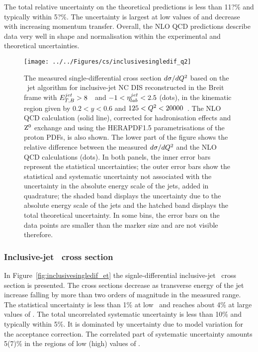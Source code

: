 The total relative uncertainty on the theoretical predictions is less than 11?\% and typically within 5?\%. The uncertainty is largest at low values of \qsq and decrease with increasing momentum transfer. Overall, the NLO QCD predictions describe data very well in shape and normalisation within the experimental and theoretical uncertainties.
\begin{figure}[p]
	\centering
		\texttt{[image: ../../Figures/cs/inclusivesingledif\_q2]}
	\caption{The measured single-differential cross section $d\sigma/d\mbox{${Q^2}$}$ based on the \kt~jet algorithm for inclusive-jet NC DIS reconstructed in the Breit frame with $\mbox{$E_{T,B}^{jet}$} > 8$~\GeV~and $-1<\mbox{$\eta^{jet}_{lab}$}<2.5$ (dots), in the kinematic region given by $0.2<y<0.6$ and $125 < \mbox{${Q^2}$} < 20000$~\GeV. The NLO QCD calculation (solid line), corrected for hadronisation effects and $\mbox{$\rm{Z}^0$}$ exchange and using the HERAPDF1.5 parametrisations of the proton PDFs, is also shown. The lower part of the figure shows the relative difference between the measured $d\sigma/d\mbox{${Q^2}$}$ and the NLO QCD calculations (dots). In both panels, the inner error bars represent the statistical uncertainties; the outer error bars show the statistical and systematic uncertainty not associated with the uncertainty in the absolute energy scale of the jets, added in quadrature; the shaded band displays the uncertainty due to the absolute energy scale of the jets and the hatched band displays the total theoretical uncertainty. In some bins, the error bars on the data points are smaller than the marker size and are not visible therefore.} 
	\label{fig:inclusivesingledif_q2}
\end{figure}

\subsubsection*{Inclusive-jet \dsdetjetb~cross section}
In Figure~\ref{fig:inclusivesingledif_et} the signle-differential inclusive-jet \dsdetjetb~cross section is presented. The cross sections decrease as transverse energy of the jet increase falling by more than two orders of magnitude in the measured range. The statistical uncertainty is less than 1\% at low \etjetb~and reaches about 4\% at large values of \etjetb. The total uncorrelated systematic uncertainty is less than 10\% and typically within 5\%. It is dominated by uncertainty due to model variation for the acceptance correction. The correlated part of systematic uncertainty amounts 5(7)\%  in the regions of low (high) values of \etjetb.

